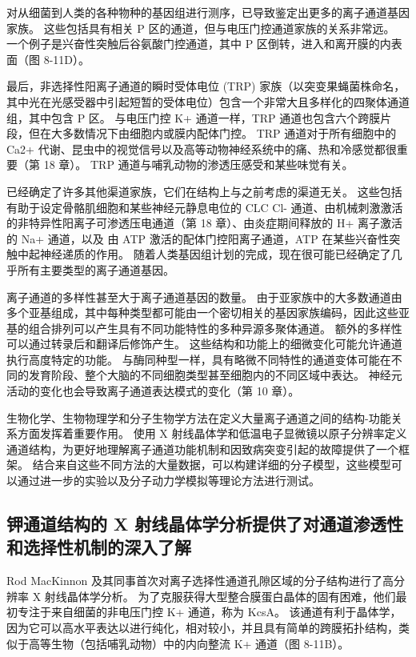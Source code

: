 对从细菌到人类的各种物种的基因组进行测序，已导致鉴定出更多的离子通道基因家族。 
这些包括具有相关 P 区的通道，但与电压门控通道家族的关系非常远。 
一个例子是兴奋性突触后谷氨酸门控通道，其中 P 区倒转，进入和离开膜的内表面（图 8-11D）。


最后，非选择性阳离子通道的瞬时受体电位 (TRP) 家族（以突变果蝇菌株命名，其中光在光感受器中引起短暂的受体电位）包含一个非常大且多样化的四聚体通道组，其中包含 P 区。 
与电压门控 K+ 通道一样，TRP 通道也包含六个跨膜片段，但在大多数情况下由细胞内或膜内配体门控。 
TRP 通道对于所有细胞中的 Ca2+ 代谢、昆虫中的视觉信号以及高等动物神经系统中的痛、热和冷感觉都很重要（第 18 章）。 
TRP 通道与哺乳动物的渗透压感受和某些味觉有关。


已经确定了许多其他渠道家族，它们在结构上与之前考虑的渠道无关。 
这些包括有助于设定骨骼肌细胞和某些神经元静息电位的 CLC Cl- 通道、由机械刺激激活的非特异性阳离子可渗透压电通道（第 18 章）、由炎症期间释放的 H+ 离子激活的 Na+ 通道，以及 由 ATP 激活的配体门控阳离子通道，ATP 在某些兴奋性突触中起神经递质的作用。 
随着人类基因组计划的完成，现在很可能已经确定了几乎所有主要类型的离子通道基因。


离子通道的多样性甚至大于离子通道基因的数量。 
由于亚家族中的大多数通道由多个亚基组成，其中每种类型都可能由一个密切相关的基因家族编码，因此这些亚基的组合排列可以产生具有不同功能特性的多种异源多聚体通道。 
额外的多样性可以通过转录后和翻译后修饰产生。 
这些结构和功能上的细微变化可能允许通道执行高度特定的功能。 
与酶同种型一样，具有略微不同特性的通道变体可能在不同的发育阶段、整个大脑的不同细胞类型甚至细胞内的不同区域中表达。 神经元活动的变化也会导致离子通道表达模式的变化（第 10 章）。


生物化学、生物物理学和分子生物学方法在定义大量离子通道之间的结构-功能关系方面发挥着重要作用。 
使用 X 射线晶体学和低温电子显微镜以原子分辨率定义通道结构，为更好地理解离子通道功能机制和因致病突变引起的故障提供了一个框架。 
结合来自这些不同方法的大量数据，可以构建详细的分子模型，这些模型可以通过进一步的实验以及分子动力学模拟等理论方法进行测试。





\subsection{钾通道结构的 X 射线晶体学分析提供了对通道渗透性和选择性机制的深入了解}
Rod MacKinnon 及其同事首次对离子选择性通道孔隙区域的分子结构进行了高分辨率 X 射线晶体学分析。 
为了克服获得大型整合膜蛋白晶体的固有困难，他们最初专注于来自细菌的非电压门控 K+ 通道，称为 KcsA。 
该通道有利于晶体学，因为它可以高水平表达以进行纯化，相对较小，并且具有简单的跨膜拓扑结构，类似于高等生物（包括哺乳动物）中的内向整流 K+ 通道（图 8-11B）。


